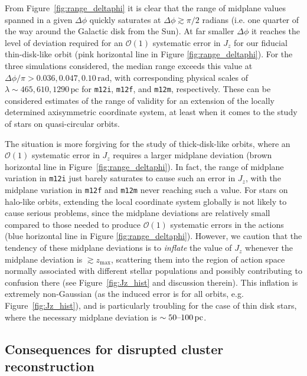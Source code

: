 \documentclass[twocolumn]{aastex62}
\newcommand{\pc}{\text{pc}}
\newcommand{\mi}{\texttt{m12i}}
\newcommand{\mf}{\texttt{m12f}}
\newcommand{\mm}{\texttt{m12m}}
\newcommand{\thincolor}{pink}
\newcommand{\thickcolor}{brown}
\newcommand{\halocolor}{blue}
\begin{document}
From Figure~\ref{fig:range_deltaphi} it is clear that the range of midplane
values spanned in a given $\Delta \phi$ quickly saturates at $\Delta \phi
\gtrsim \pi/2$ radians (i.e. one quarter of the way around the Galactic disk
from the Sun). At far smaller $\Delta \phi$ it reaches the level of deviation
required for an $\mathcal{O}(1)$ systematic error in $J_z$ for our fiducial
thin-disk-like orbit (\thincolor{} horizontal line in Figure
\ref{fig:range_deltaphi}). For the three simulations considered, the median
range exceeds this value at $\Delta \phi/\pi > 0.036, 0.047,
0.10\,\text{rad}$, with corresponding physical scales of $\lambda \sim 465,
610, 1290\,\pc$ for \mi{}, \mf{}, and \mm{}, respectively. These can be
considered estimates of the range of validity for an extension of the locally
determined axisymmetric coordinate system, at least when it comes to the study
of stars on quasi-circular orbits.

The situation is more forgiving for the study of thick-disk-like orbits, where
an $\mathcal{O}(1)$ systematic error in $J_z$ requires a larger midplane
deviation (\thickcolor{} horizontal line in Figure~\ref{fig:range_deltaphi}).
In fact, the range of midplane variation in \mi{} just barely saturates to
cause such an error in $J_z$, with the midplane variation in \mf{} and \mm{}
never reaching such a value. For stars on halo-like orbits, extending the
local coordinate system globally is not likely to cause serious problems,
since the midplane deviations are relatively small compared to those needed to
produce $\mathcal{O}(1)$ systematic errors in the actions (\halocolor{}
horizontal line in Figure \ref{fig:range_deltaphi}). However, we caution that
the tendency of these midplane deviations is to \emph{inflate} the value of
$J_z$ whenever the midplane deviation is $\gtrsim z_{\text{max}}$, scattering
them into the region of action space normally associated with different
stellar populations and possibly contributing to confusion there (see
Figure~\ref{fig:Jz_hist} and discussion therein). This inflation is extremely
non-Gaussian (as the induced error is for all orbits, e.g.
Figure~\ref{fig:Jz_hist}), and is particularly troubling for the case of thin
disk stars, where the necessary midplane deviation is
$\sim50\textup{--}100\,\pc$.

\subsection{Consequences for disrupted cluster reconstruction}
\label{sssec:reconstruction}
\end{document}
